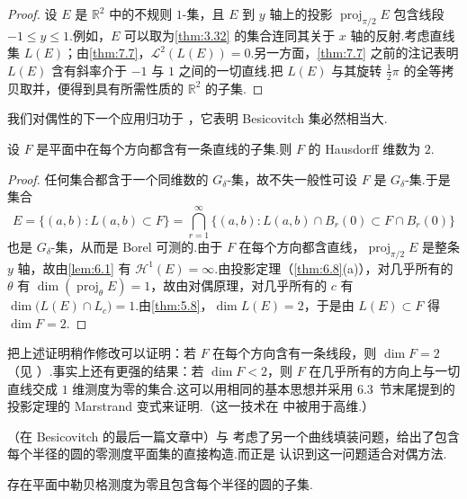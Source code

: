 \begin{proof}
设 $E$ 是 $\mathbb{R}^2$ 中的不规则 $1$-集，且 $E$ 到 $y$ 轴上的投影 $\operatorname{proj}_{\pi/2}E$ 包含线段 $-1\leq y\leq 1$.例如，$E$ 可以取为\cref{thm:3.32} 的集合连同其关于 $x$ 轴的反射.考虑直线集 $L(E)$；由\cref{thm:7.7}，$\mathscr{L}^2(L(E))=0$.另一方面，\cref{thm:7.7} 之前的注记表明 $L(E)$ 含有斜率介于 $-1$ 与 $1$ 之间的一切直线.把 $L(E)$ 与其旋转 $\frac{1}{2}\pi$ 的全等拷贝取并，便得到具有所需性质的 $\mathbb{R}^2$ 的子集.
\end{proof}

我们对偶性的下一个应用归功于 \textcite{davies1971}，它表明 Besicovitch 集必然相当大.

\begin{theorem}\label{thm:7.9}
设 $F$ 是平面中在每个方向都含有一条直线的子集.则 $F$ 的 Hausdorff 维数为 $2$.
\end{theorem}

\begin{proof}
任何集合都含于一个同维数的 $G_{\delta}$-集，故不失一般性可设 $F$ 是 $G_{\delta}$-集.于是集合
\[
  E=\{(a,b):L(a,b)\subset F\}
  =\bigcap_{r=1}^{\infty}\{(a,b):L(a,b)\cap B_r(0)\subset F\cap B_r(0)\}
\]
也是 $G_{\delta}$-集，从而是 Borel 可测的.由于 $F$ 在每个方向都含直线，$\operatorname{proj}_{\pi/2}E$ 是整条 $y$ 轴，故由\cref{lem:6.1} 有 $\mathcal{H}^1(E)=\infty$.由投影定理（\cref{thm:6.8}(a)），对几乎所有的 $\theta$ 有 $\dim(\operatorname{proj}_{\theta}E)=1$，故由对偶原理，对几乎所有的 $c$ 有 $\dim\bigl(L(E)\cap L_c\bigr)=1$.由\cref{thm:5.8}，$\dim L(E)=2$，于是由 $L(E)\subset F$ 得 $\dim F=2$.
\end{proof}

把上述证明稍作修改可以证明：若 $F$ 在每个方向含有一条线段，则 $\dim F=2$（见 \textcite{davies1971}）.事实上还有更强的结果：若 $\dim F<2$，则 $F$ 在几乎所有的方向上与一切直线交成 $1$ 维测度为零的集合.这可以用相同的基本思想并采用 6.3~节末尾提到的投影定理的 Marstrand 变式来证明.（这一技术在\citeyear{falconer1980b} 中被用于高维.）

\textcite{besicovitchrado1968}（在 Besicovitch 的最后一篇文章中）与 \textcite{kinney1968} 考虑了另一个曲线填装问题，给出了包含每个半径的圆的零测度平面集的直接构造.而正是 \textcite{davies1972} 认识到这一问题适合对偶方法.

\begin{theorem}\label{thm:7.10}
存在平面中勒贝格测度为零且包含每个半径的圆的子集.
\end{theorem}

